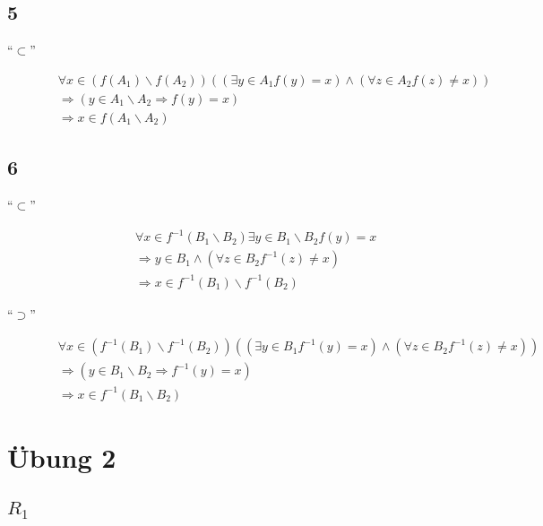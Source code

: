 \documentclass[a4paper,10pt]{article}
\begin{document}
\subsection*{5}

\begin{description}
 \item[``$\subset$'']
 \begin{align*}
  & \forall x \in (f(A_1) \backslash f(A_2)) ((\exists y \in A_1 f(y) = x) \land (\forall z \in A_2 f(z) \ne x))\\
  & \Rightarrow (y \in A_1 \backslash A_2 \Rightarrow f(y) = x)\\
  & \Rightarrow x \in f(A_1 \backslash A_2)
 \end{align*}
\end{description}

\subsection*{6}

\begin{description}
 \item[``$\subset$'']
 \begin{align*}
  & \forall x \in f^{-1}(B_1 \backslash B_2) \exists y \in B_1 \backslash B_2 f(y) = x\\
  & \Rightarrow y \in B_1 \land (\forall z \in B_2 f^{-1}(z) \ne x)\\
  & \Rightarrow x \in f^{-1}(B_1) \backslash f^{-1}(B_2)
 \end{align*}
 
 \item[``$\supset$'']
 \begin{align*}
  & \forall x \in (f^{-1}(B_1) \backslash f^{-1}(B_2)) ((\exists y \in B_1 f^{-1}(y) = x) \land (\forall z \in B_2 f^{-1}(z) \ne x))\\
  & \Rightarrow (y \in B_1 \backslash B_2 \Rightarrow f^{-1}(y) = x)\\
  & \Rightarrow x \in f^{-1}(B_1 \backslash B_2)
 \end{align*}
\end{description}

\section*{Übung 2}

\subsection*{$R_1$}
\end{document}

